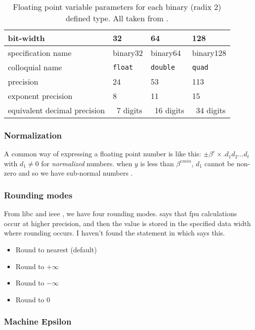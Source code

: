 \documentclass[american]{article}
\begin{document}
\FloatBarrier
\begin{table}[t]
	\caption{Floating point variable parameters for each binary (radix 2) defined type. All taken from \cite{ieee-754-2008}.} \label{tab:float-par}
\begin{tabular}{llll}
\hline
bit-width & 32 & 64 & 128 \\
\hline
specification name & binary32 & binary64 & binary128 \\
\hline
colloquial name & \texttt{float} & \texttt{double} & \texttt{quad} \\
\hline
precision & 24 & 53 & 113 \\
\hline
exponent precision & 8 & 11 & 15 \\
\hline
equivalent decimal precision & ~7 digits & ~16 digits & ~34 digits \\
\hline
\end{tabular}
\end{table}
\FloatBarrier

\subsubsection{Normalization}

A common way of expressing a floating point number is like this: $\pm\beta^e\times. d_1 d_2 \ldots d_t$ with $d_1 \neq 0$ for \textit{normalized} numbers. when $y$ is less than $\beta^{emin}$, $d_1$ cannot be non-zero and so we have sub-normal numbers \cite{higham-numerical-accuracy-and-stability}.

\subsubsection{Rounding modes}

From libc and ieee \cite{gnu-libc-rounding,ieee-754-2008}, we have four rounding modes. \cite{gnu-libc-rounding} says that fpu calculations occur at higher precision, and then the value is stored in the specified data width where rounding occurs. I haven't found the statement in \cite{ieee-754-2008} which says this.

\begin{itemize}
\item Round to nearest (default)
\item Round to $+\infty$
\item Round to $-\infty$
\item Round to 0
\end{itemize}

\subsubsection{Machine Epsilon}
\end{document}
